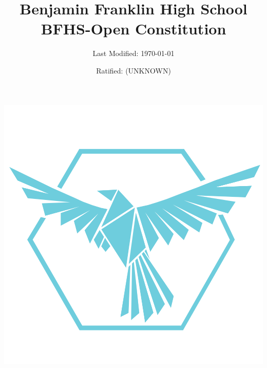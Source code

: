 \documentclass{article}
\title{Benjamin Franklin High School \\ BFHS-Open Constitution}
\date{Ratified: (UNKNOWN)}
\author{Last Modified: \today}
\newcommand{\inputarticle}[1]{\newpage~}
\begin{document}
	\maketitle
	\includegraphics[width=\textwidth]{./assets/logo.png}
	\newpage

	\tableofcontents

	\inputarticle{./articles/article-01.tex}
	\inputarticle{./articles/article-02.tex}
	\inputarticle{./articles/article-03.tex}
	\inputarticle{./articles/article-04.tex}
	\inputarticle{./articles/article-05.tex}
	\inputarticle{./articles/article-06.tex}
	\inputarticle{./articles/article-07.tex}
	\inputarticle{./articles/article-08.tex}
	\inputarticle{./articles/article-09.tex}
	\inputarticle{./articles/article-10.tex}
\end{document}

